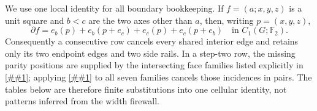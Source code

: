 \documentclass[11pt]{article}
\newcommand{\cref}[1]{\autoref{##1}}%
\newcommand{\Ftwo}{\mathbb F_2}
\begin{document}
We use one local identity for all boundary bookkeeping.  If
\(f=(a;x,y,z)\) is a unit square and \(b<c\) are the two axes other than
\(a\), then, writing \(p=(x,y,z)\),
\begin{equation}\label{eq:square-cellular-boundary}
 \partial f=e_b(p)+e_b(p+e_c)+e_c(p)+e_c(p+e_b)
 \quad\text{in }C_1(G;\Ftwo).
\end{equation}
Consequently a consecutive row cancels every shared interior edge and
retains only its two endpoint edges and two side rails.  In a step-two row,
the missing parity positions are supplied by the intersecting face families
listed explicitly in \cref{eq:opposite-cut}; applying
\cref{eq:square-cellular-boundary} to all seven families cancels those
incidences in pairs.  The tables below are therefore finite substitutions
into one cellular identity, not patterns inferred from the width firewall.
\end{document}
